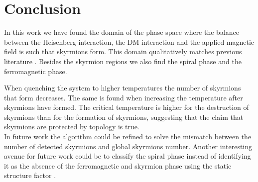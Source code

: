 \section{Conclusion}

In this work we have found the domain of the phase space where the balance between the Heisenberg interaction, the DM interaction and the applied magnetic field is such that skyrmions form.
This domain qualitatively matches previous literature \cite{10.1063/9.0000082}.
Besides the skyrmion regions we also find the spiral phase and the ferromagnetic phase.

When quenching the system to higher temperatures the number of skyrmions that form decreases. 
The same is found when increasing the temperature after skyrmions have formed.
The critical temperature is higher for the destruction of skyrmions than for the formation of skyrmions, suggesting that the claim that skyrmions are protected by topology is true.
\\
In future work the algorithm could be refined to solve the mismatch between the number of detected skyrmions and global skyrmions number.
Another interesting avenue for future work could be to classify the spiral phase instead of identifying it as the absence of the ferromagnetic and skyrmion phase using the static structure factor \cite{Haller_2022}.


